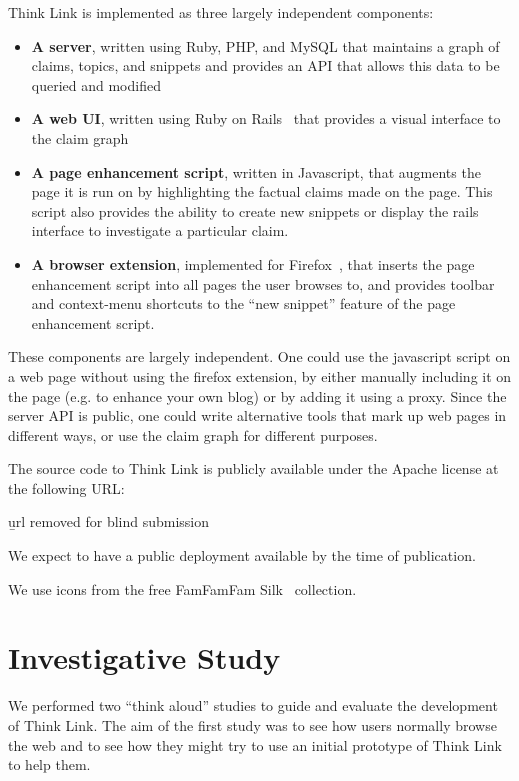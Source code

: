 \documentclass{chi2009}
\begin{document}
Think Link is implemented as three largely independent components:

\begin{itemize}
\item {\bf A server}, written using Ruby, PHP, and MySQL that maintains a graph of claims, topics, and snippets and provides an API that allows this data to be queried and modified
\item {\bf A web UI}, written using Ruby on Rails~\cite{rails} that provides a visual interface to the claim graph
\item {\bf A page enhancement script}, written in Javascript, that augments the page it is run on by highlighting the factual claims made on the page. This script also provides the ability to create new snippets or display the rails interface to investigate a particular claim.
\item {\bf A browser extension}, implemented for Firefox~\cite{firefoxextension}, that inserts the page enhancement script into all pages the user browses to, and provides toolbar and context-menu shortcuts to the ``new snippet'' feature of the page enhancement script.
\end{itemize}

These components are largely independent. One could use the javascript script on a web page without using the firefox extension, by either manually including it on the page (e.g. to enhance your own blog) or by adding it using a proxy. Since the server API is public, one could write alternative tools that mark up web pages in different ways, or use the claim graph for different purposes.

The source code to Think Link is publicly available under the Apache license at the following URL:

{\b url removed for blind submission}

We expect to have a public deployment available by the time of publication.

We use icons from the free FamFamFam Silk~\cite{silkicons} collection.



\section{Investigative Study}

We performed two ``think aloud'' studies to guide and evaluate the development of Think Link. The aim of the first study was to see how users normally browse the web and to see how they might try to use an initial prototype of Think Link to help them. 
\end{document}
